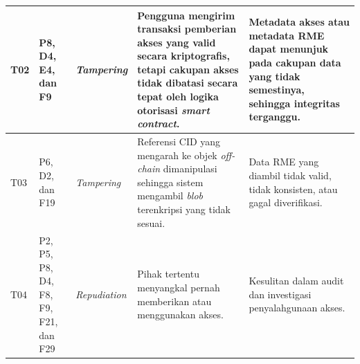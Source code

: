 \documentclass[bahasa, 12pt, a4paper, onecolumn, oneside, final]{report}
\begin{document}
{\begin{longtable}{|p{0.65cm}|p{2.2cm}|p{1.9cm}|p{4cm}|p{4cm}|}
		T02                                                                                                                                                                         &
		P8, D4, E4, dan F9                                                                                                                                                          &
		\textit{Tampering}                                                                                                                                                          &
		Pengguna mengirim transaksi pemberian akses yang valid secara kriptografis, tetapi cakupan akses tidak dibatasi secara tepat oleh logika otorisasi \textit{smart contract}. &
		Metadata akses atau metadata RME dapat menunjuk pada cakupan data yang tidak semestinya, sehingga integritas terganggu.                                                                                                                                                  \\
		\hline

		T03                                                                                                                                                                         &
		P6, D2, dan F19                                                                                                                                                             &
		\textit{Tampering}                                                                                                                                                          &
		Referensi CID yang mengarah ke objek \textit{off-chain} dimanipulasi sehingga sistem mengambil \textit{blob} terenkripsi yang tidak sesuai.                                 &
		Data RME yang diambil tidak valid, tidak konsisten, atau gagal diverifikasi.                                                                                                                                                                                             \\
		\hline

		T04                                                                                                                                                                         &
		P2, P5, P8, D4, F8, F9, F21, dan F29                                                                                                                                        &
		\textit{Repudiation}                                                                                                                                                        &
		Pihak tertentu menyangkal pernah memberikan atau menggunakan akses.                                                                                                         &
		Kesulitan dalam audit dan investigasi penyalahgunaan akses.                                                                                                                                                                                                              \\
		\hline


\end{longtable}}
\end{document}
